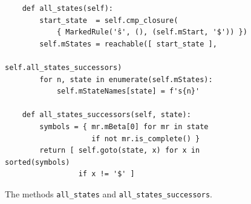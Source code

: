 \begin{figure}[!ht]
\centering
\begin{verbatim}
    def all_states(self):
        start_state  = self.cmp_closure(
            { MarkedRule('ŝ', (), (self.mStart, '$')) })
        self.mStates = reachable([ start_state ],
                                 self.all_states_successors)
        for n, state in enumerate(self.mStates):
            self.mStateNames[state] = f's{n}'

    def all_states_successors(self, state):
        symbols = { mr.mBeta[0] for mr in state
                    if not mr.is_complete() }
        return [ self.goto(state, x) for x in sorted(symbols)
                 if x != '$' ]
\end{verbatim}
\vspace*{-0.3cm}
\caption{The methods \texttt{all\_states} and \texttt{all\_states\_successors}.}
\label{fig:04-SLR-Table-Generator.ipynb:all_states}
\end{figure}


